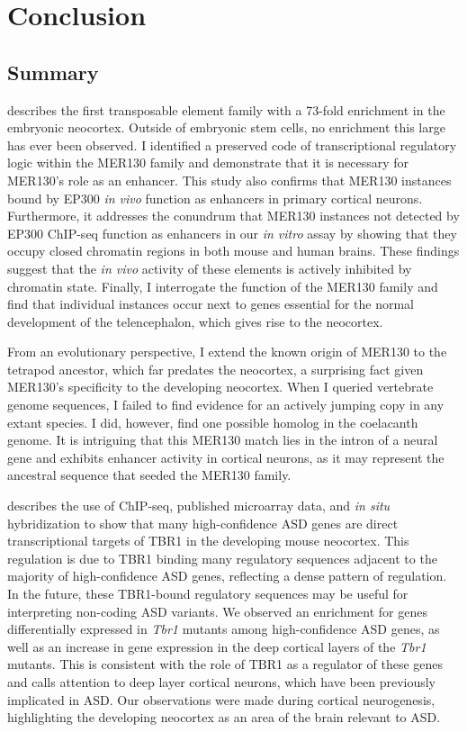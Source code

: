 \chapter{Conclusion}
\label{chap:conclusion}

\section{Summary}

 describes the first transposable element family with a 73-fold enrichment in the embryonic neocortex. Outside of embryonic stem cells, no enrichment this large has ever been observed. I identified a preserved code of transcriptional regulatory logic within the MER130 family and demonstrate that it is necessary for MER130's role as an enhancer. This study also confirms that MER130 instances bound by EP300 \emph{in vivo} function as enhancers in primary cortical neurons. Furthermore, it addresses the conundrum that MER130 instances not detected by EP300 ChIP-seq function as enhancers in our \emph{in vitro} assay by showing that they occupy closed chromatin regions in both mouse and human brains. These findings suggest that the \emph{in vivo} activity of these elements is actively inhibited by chromatin state. Finally, I interrogate the function of the MER130 family and find that individual instances occur next to genes essential for the normal development of the telencephalon, which gives rise to the neocortex.

From an evolutionary perspective, I extend the known origin of MER130 to the tetrapod ancestor, which far predates the neocortex, a surprising fact given MER130's specificity to the developing neocortex. When I queried vertebrate genome sequences, I failed to find evidence for an actively jumping copy in any extant species. I did, however, find one possible homolog in the coelacanth genome. It is intriguing that this MER130 match lies in the intron of a neural gene and exhibits enhancer activity in cortical neurons, as it may represent the ancestral sequence that seeded the MER130 family.

 describes the use of ChIP-seq, published microarray data, and \emph{in situ} hybridization to show that many high-confidence ASD genes are direct transcriptional targets of TBR1 in the developing mouse neocortex. This regulation is due to TBR1 binding many regulatory sequences adjacent to the majority of high-confidence ASD genes, reflecting a dense pattern of regulation. In the future, these TBR1-bound regulatory sequences may be useful for interpreting non-coding ASD variants. We observed an enrichment for genes differentially expressed in \emph{Tbr1} mutants among high-confidence ASD genes, as well as an increase in gene expression in the deep cortical layers of the \emph{Tbr1} mutants. This is consistent with the role of TBR1 as a regulator of these genes and calls attention to deep layer cortical neurons, which have been previously implicated in ASD. Our observations were made during cortical neurogenesis, highlighting the developing neocortex as an area of the brain relevant to ASD. 

